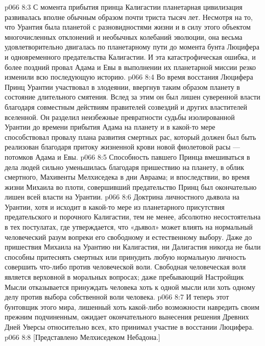\vs p066 8:3 \pc С момента прибытия принца Калигастии планетарная цивилизация развивалась вполне обычным образом почти триста тысяч лет. Несмотря на то, что Урантия была планетой с разновидностями жизни и в силу этого объектом многочисленных отклонений и необычных колебаний эволюции, она весьма удовлетворительно двигалась по планетарному пути до момента бунта Люцифера и одновременного предательства Калигастии. И эта катастрофическая ошибка, и более поздний провал Адама и Евы в выполнении их планетарной миссии резко изменили всю последующую историю.
\vs p066 8:4 Во время восстания Люцифера Принц Урантии участвовал в злодеянии, ввергнув таким образом планету в состояние длительного смятения. Вслед за этим он был лишен суверенной власти благодаря совместным действиям правителей созвездий и других властителей вселенной. Он разделил неизбежные превратности судьбы изолированной Урантии до времени прибытия Адама на планету и в какой\hyp{}то мере способствовал провалу плана развития смертных рас, который должен был быть реализован благодаря притоку жизненной крови новой фиолетовой расы --- потомков Адама и Евы.
\vs p066 8:5 Способность павшего Принца вмешиваться в дела людей сильно уменьшилась благодаря пришествию на планету, в облик смертного, Махивенты Мелхиседека в дни Авраама; и впоследствии, во время жизни Михаила во плоти, совершивший предательство Принц был окончательно лишен всей власти на Урантии.
\vs p066 8:6 \pc Доктрина личностного дьявола на Урантии, хотя и исходит в какой\hyp{}то мере из планетарного присутствия предательского и порочного Калигастии, тем не менее, абсолютно несостоятельна в тех постулатах, где утверждается, что «дьявол» может влиять на нормальный человеческий разум вопреки его свободному и естественному выбору. Даже до пришествия Михаила на Урантию ни Калигастия, ни Далигастия никогда не были способны притеснять смертных или принудить любую нормальную личность совершить что\hyp{}либо против человеческой воли. Свободная человеческая воля является верховной в моральных вопросах; даже пребывающий Настройщик Мысли отказывается принуждать человека хоть к одной мысли или хоть одному делу против выбора собственной воли человека.
\vs p066 8:7 И теперь этот бунтовщик этого мира, лишенный хоть какой\hyp{}либо возможности навредить своим прежним подчиненным, ожидает окончательного вынесения решения Древних Дней Уверсы относительно всех, кто принимал участие в восстании Люцифера.
\vsetoff
\vs p066 8:8 [Представлено Мелхиседеком Небадона.]

